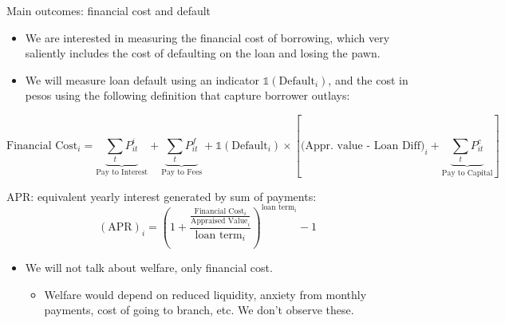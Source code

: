 \documentclass[8pt]{beamer}
\begin{document}
\begin{frame}{Main outcomes: financial cost and default}
\label{fc_outcome}
\begin{itemize}
    \item We are interested in measuring the financial cost of borrowing, which very saliently includes the cost of defaulting on the loan and losing the pawn.
    \item We will measure loan default using an indicator $\mathds{1}(\text{Default}_i)$, and the cost in pesos using the following definition that capture borrower outlays:
\end{itemize}

   \begin{equation*}
    \text{Financial Cost}_i =  \underbrace{\sum_t P^i_{it}}_{\text{Pay to Interest}} + \underbrace{\sum_t P^f_{it}}_{\text{Pay to Fees}}  + \mathds{1}(\text{Default}_i) \times \left[\text{(Appr. value - Loan Diff)}_i + \underbrace{\sum_t P^c_{it}}_{\text{Pay to Capital}} \right]
   \end{equation*}

\vspace{.2in}
\: \: \: \: APR: equivalent yearly interest generated by sum of payments:
   \begin{equation*}
    (\text{APR})_i =\left( 1 + \frac{\frac{\text{Financial Cost}_i}{\text{Appraised Value}_i}}{\text{loan term}_i}\right)^{\text{loan term}_i}-1 
\end{equation*}

   \vspace{.2in}
\begin{itemize}
    \item We \alert{will not talk about welfare}, only financial cost.
    \begin{itemize}
        \item Welfare would depend on reduced liquidity, anxiety from monthly payments, cost of going to branch, etc. We don't observe these.
    \end{itemize}
\end{itemize}
\end{frame}
\end{document}
